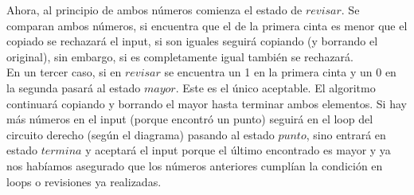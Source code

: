 \documentclass[12pt]{article}
\begin{document}
Ahora, al principio de ambos números comienza el estado de $revisar$. Se comparan ambos números, si encuentra que el de la primera cinta es menor que el copiado se rechazará el input, si son iguales seguirá copiando (y borrando el original), sin embargo, si es completamente igual también se rechazará.\\

En un tercer caso, si en $revisar$ se encuentra un 1 en la primera cinta y un 0 en la segunda pasará al estado $mayor$. Este es el único aceptable. El algoritmo continuará copiando y borrando el mayor hasta terminar ambos elementos. Si hay más números en el input (porque encontró un punto) seguirá en el loop del circuito derecho (según el diagrama) pasando al estado $punto$, sino entrará en estado $termina$ y aceptará el input porque el último encontrado es mayor y ya nos habíamos asegurado que los números anteriores cumplían la condición en loops o revisiones ya realizadas.

\vspace{4ex}
\end{document}
